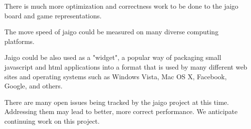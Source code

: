 \documentclass{memoir}
\begin{document}
There is much more optimization and correctness work to be done to the jaigo board and game representations.

The move speed of jaigo could be measured on many diverse computing platforms.

Jaigo could be also used as a "widget", a popular way of packaging small javascript and html applications into a format that is used by many different web sites and operating systems such as Windows Vista, Mac OS X, Facebook, Google, and others.

There are many open issues being tracked by the jaigo project at this time. Addressing them may lead to better, more correct performance. We anticipate continuing work on this project.




\end{document}

